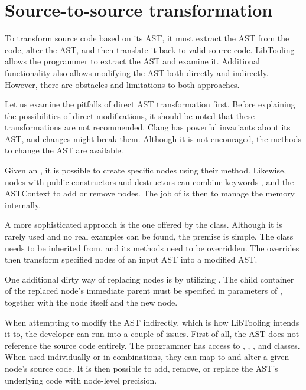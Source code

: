
\section{Source-to-source transformation}

To transform source code based on its AST, it must extract the AST 
from the code, alter the AST, and then translate it back to valid 
source code. 
LibTooling allows the programmer to extract the AST and examine it. 
Additional functionality also allows modifying the AST both directly 
and indirectly. 
However, there are obstacles and limitations to both approaches. 

Let us examine the pitfalls of direct AST transformation first. 
Before explaining the possibilities of direct modifications, it 
should be noted that these transformations are not recommended. 
Clang has powerful invariants about its AST, and changes might 
break them. 
Although it is not encouraged, the methods to change the AST 
are available.

Given an , it is possible to create specific nodes
using their  method. 
Likewise, nodes with public constructors and destructors can combine 
keywords ,  and the ASTContext 
to add or remove nodes. 
The job of  is then to manage the memory internally.

A more sophisticated approach is the one offered 
by the  class. 
Although it is rarely used and no real examples can be found, 
the premise is simple. 
The  class needs to be inherited from, 
and its  methods need to be overridden. 
The overrides then transform specified nodes of an input AST 
into a modified AST.

One additional dirty way of replacing nodes is by utilizing 
. 
The child container of the replaced node's immediate parent must be 
specified in parameters of , together with 
the node itself and the new node.

When attempting to modify the AST indirectly, which is how LibTooling 
intends it to, the developer can run into a couple of issues. 
First of all, the AST does not reference the source code entirely. 
The programmer has access to , ,
, and  classes. 
When used individually or in combinations, they can map to and alter 
a given node's source code.
It is then possible to add, remove, or replace the AST's underlying 
code with node-level precision.

